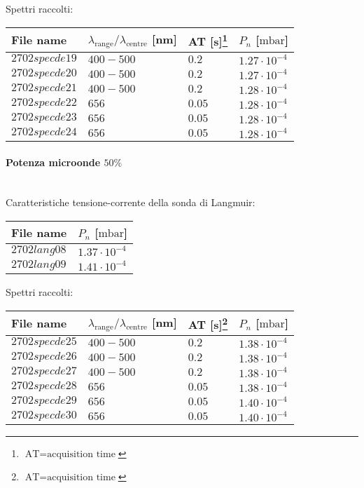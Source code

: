 Spettri raccolti:
\begin{center}
\begin{tabular}{p{3cm}p{4cm}p{2cm}p{3cm}}
\toprule
File name	&$\lambda_\text{range}\text{/}\lambda_\text{centre}$ [nm] 	&AT [s]\footnote{$\text{AT}=\text{acquisition time}$} &$P_n$ [$\si{\milli\bar}$]\\
\midrule
$2702specde19$	&$400-500$	&$0.2$		&$1.27\cdot10^{-4}$\\
$2702specde20$	&$400-500$	&$0.2$		&$1.27\cdot10^{-4}$\\
$2702specde21$	&$400-500$	&$0.2$		&$1.28\cdot10^{-4}$\\
$2702specde22$	&$656$		&$0.05$		&$1.28\cdot10^{-4}$\\
$2702specde23$	&$656$		&$0.05$		&$1.28\cdot10^{-4}$\\
$2702specde24$	&$656$		&$0.05$		&$1.28\cdot10^{-4}$\\
\bottomrule
\end{tabular}
\end{center}

\paragraph*{Potenza microonde $\text{50\%}$} ~\\
Caratteristiche tensione-corrente della sonda di Langmuir:
\begin{center}
\begin{tabular}{p{3cm}p{3cm}}
\toprule
File name	&$P_n$ [$\si{\milli\bar}$]\\
\midrule
$2702lang08$	&$1.37\cdot10^{-4}$\\
$2702lang09$	&$1.41\cdot10^{-4}$\\
\bottomrule
\end{tabular}
\end{center}

Spettri raccolti:
\begin{center}
\begin{tabular}{p{3cm}p{4cm}p{2cm}p{3cm}}
\toprule
File name	&$\lambda_\text{range}\text{/}\lambda_\text{centre}$ [nm] 	&AT [s]\footnote{$\text{AT}=\text{acquisition time}$} &$P_n$ [$\si{\milli\bar}$]\\
\midrule
$2702specde25$	&$400-500$	&$0.2$		&$1.38\cdot10^{-4}$\\
$2702specde26$	&$400-500$	&$0.2$		&$1.38\cdot10^{-4}$\\
$2702specde27$	&$400-500$	&$0.2$		&$1.38\cdot10^{-4}$\\
$2702specde28$	&$656$		&$0.05$		&$1.38\cdot10^{-4}$\\
$2702specde29$	&$656$		&$0.05$		&$1.40\cdot10^{-4}$\\
$2702specde30$	&$656$		&$0.05$		&$1.40\cdot10^{-4}$\\
\bottomrule
\end{tabular}
\end{center}

